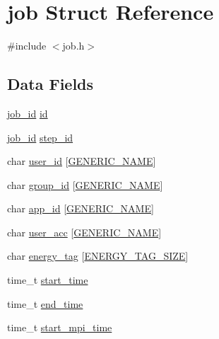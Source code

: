 \hypertarget{structjob}{}\section{job Struct Reference}
\label{structjob}


{\ttfamily \#include $<$job.\+h$>$}

\subsection*{Data Fields}
\begin{DoxyCompactItemize}
\item 
\hyperlink{generic_8h_aa17a8e6cdc1860741119dc46c1777778}{job\+\_\+id} \hyperlink{structjob_a7cb6b79b4033fbd0b8ab22ce6b9047a8}{id}
\item 
\hyperlink{generic_8h_aa17a8e6cdc1860741119dc46c1777778}{job\+\_\+id} \hyperlink{structjob_a8408254d81fc3e4674c44e37dcc8927e}{step\+\_\+id}
\item 
char \hyperlink{structjob_a3321c44174e0b6e58dc7eb501946ec0a}{user\+\_\+id} \mbox{[}\hyperlink{loop_8h_a6b0b8b14cfc75447be8feba3efe18da8}{G\+E\+N\+E\+R\+I\+C\+\_\+\+N\+A\+ME}\mbox{]}
\item 
char \hyperlink{structjob_a9a9fda8b920aa7005ad6e61f1660bbcb}{group\+\_\+id} \mbox{[}\hyperlink{loop_8h_a6b0b8b14cfc75447be8feba3efe18da8}{G\+E\+N\+E\+R\+I\+C\+\_\+\+N\+A\+ME}\mbox{]}
\item 
char \hyperlink{structjob_ac8ae0afb961355375b16051aa4f2ca22}{app\+\_\+id} \mbox{[}\hyperlink{loop_8h_a6b0b8b14cfc75447be8feba3efe18da8}{G\+E\+N\+E\+R\+I\+C\+\_\+\+N\+A\+ME}\mbox{]}
\item 
char \hyperlink{structjob_af5a26f0b756dedb4094cd26fe79a0b2a}{user\+\_\+acc} \mbox{[}\hyperlink{loop_8h_a6b0b8b14cfc75447be8feba3efe18da8}{G\+E\+N\+E\+R\+I\+C\+\_\+\+N\+A\+ME}\mbox{]}
\item 
char \hyperlink{structjob_a5438f13c919dcb9081d3205a78c14aad}{energy\+\_\+tag} \mbox{[}\hyperlink{generic_8h_a66b27a352f53330f00427599fa2865d2}{E\+N\+E\+R\+G\+Y\+\_\+\+T\+A\+G\+\_\+\+S\+I\+ZE}\mbox{]}
\item 
time\+\_\+t \hyperlink{structjob_a6453c9870ac207fc58340cb03b3e062f}{start\+\_\+time}
\item 
time\+\_\+t \hyperlink{structjob_a31733ff42c912ce3d700077efd63bcec}{end\+\_\+time}
\item 
time\+\_\+t \hyperlink{structjob_a207f6300ea72581b602b810d810c06b0}{start\+\_\+mpi\+\_\+time}
\item 

\end{DoxyCompactItemize}
